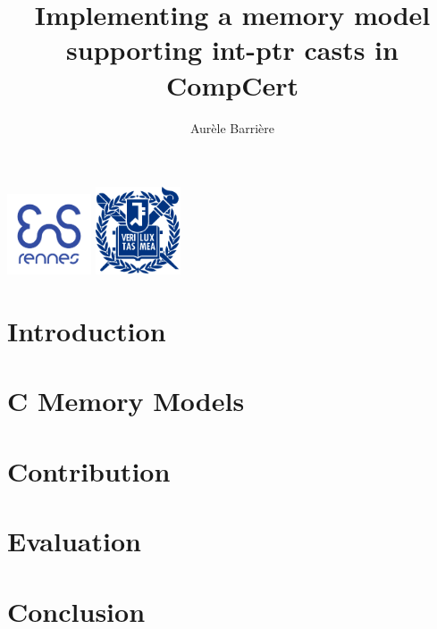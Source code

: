 \documentclass[page number]{beamer}
\begin{document}
\title[Int-Ptr casts in CompCert]{Implementing a memory model supporting int-ptr casts in CompCert}


\author{Aur\`ele Barri\`ere}

\def\todo#1{{\color{red}TODO:\quad#1}}
\def\addref#1{{\color{red}$[$#1$]$}}
\def\undef{\textit{undef}}
\def\states#1{\mathit{States_{#1}}}
\def\step#1{\mathit{Step_{#1}}}
\def\atstep#1{\mathit{AtomicStep_{#1}}}
\def\traces{\mathit{Traces}}
\def\comment#1{{\color{blue}\textit{#1}}}
\def\outline{
  \begin{frame}[plain,noframenumbering]
    \frametitle{Outline}
    \tableofcontents[currentsection]
  \end{frame}
}



\begin{frame}
  \titlepage%
  \vfill
  \begin{center}
    \includegraphics[width=2.5cm]{img/enslogo.png}
    \hfill
    \includegraphics[width=2.5cm]{img/snulogo.png}
  \end{center}
\end{frame}

\section{Introduction}


\section{C Memory Models}



\section{Contribution}


\section{Evaluation}


\section{Conclusion}

\end{document}
